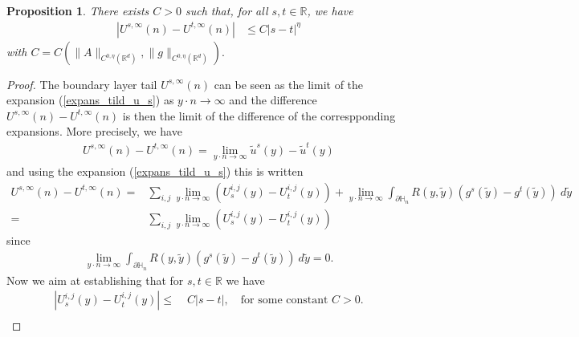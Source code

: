 \documentclass[10pt,a4paper]{amsart}
\newtheorem{proposition}{Proposition}
\begin{document}
	\begin{proposition}
		There exists $C>0$ such that, for all $s,t\in\mathbb{R}$,	we have 
		\begin{align*}
			|U^{s,\infty}(n) -U^{t,\infty}(n)| &\leq C |s-t|^{\eta}
		\end{align*}
			with  $C=C\left(\|A\|_{C^{0,\eta}(\mathbb{R}^d)},   \|g\|_{C^{0,\eta}(\mathbb{R}^d)}\right).$
	\end{proposition}

	\begin{proof}[Proof]
		
		The boundary layer tail $U^{s,\infty}(n)$  can be seen as the limit of the expansion (\ref{expans_tild_u_s}) as  $y\cdot n\rightarrow \infty$ and the difference  $U^{s,\infty}(n) -U^{t,\infty}(n)$ is then the limit of the difference of the correspponding expansions. More precisely, we have 
		\begin{align*}
			U^{s,\infty}(n) -U^{t,\infty}(n)= 	\lim_{y\cdot n \rightarrow \infty}	\tilde{u}^s(y)-\tilde{u}^t(y)
		\end{align*}
		and using the expansion (\ref{expans_tild_u_s}) this is written
		\begin{align*}
			U^{s,\infty}(n) -U^{t,\infty}(n)= &	\sum_{i,j} \lim_{y\cdot n \rightarrow \infty}  (U_s^{i,j}(y) -U_t^{i,j}(y)) +   \lim_{y\cdot n \rightarrow \infty} \int_{\partial\mathbb{H}_n} R(y,\tilde{y})(g^s(\tilde{y})-g^t(\tilde{y}))\ d\tilde{y}\\
			=&	\sum_{i,j} \lim_{y\cdot n \rightarrow \infty}  (U_s^{i,j}(y) -U_t^{i,j}(y)) 
		\end{align*}
		since
		\begin{align*}
			\lim_{y\cdot n \rightarrow \infty} \int_{\partial\mathbb{H}_n} R(y,\tilde{y})(g^s(\tilde{y})-g^t(\tilde{y}))\ d\tilde{y}=0.
		\end{align*}
		Now we aim at establishing that for $s,t\in\mathbb{R}$ we have 
		\begin{align*}
			|	U^{i,j}_{s}(y)- 	U^{i,j}_{t}(y) |
			\leq &\; C |s-t|, \quad \mbox{for some constant } C>0. \\
		\end{align*}
		

\end{proof}
\end{document}
